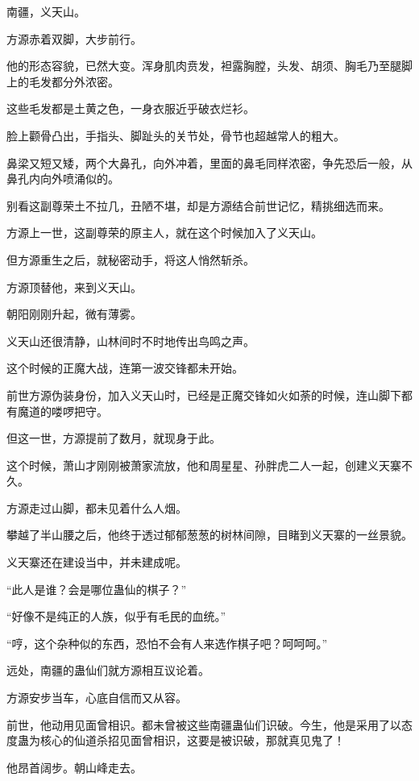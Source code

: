 
\begin{this_body}

南疆，义天山。

方源赤着双脚，大步前行。

他的形态容貌，已然大变。浑身肌肉贲发，袒露胸膛，头发、胡须、胸毛乃至腿脚上的毛发都分外浓密。

这些毛发都是土黄之色，一身衣服近乎破衣烂衫。

脸上颧骨凸出，手指头、脚趾头的关节处，骨节也超越常人的粗大。

鼻梁又短又矮，两个大鼻孔，向外冲着，里面的鼻毛同样浓密，争先恐后一般，从鼻孔内向外喷涌似的。

别看这副尊荣土不拉几，丑陋不堪，却是方源结合前世记忆，精挑细选而来。

方源上一世，这副尊荣的原主人，就在这个时候加入了义天山。

但方源重生之后，就秘密动手，将这人悄然斩杀。

方源顶替他，来到义天山。

朝阳刚刚升起，微有薄雾。

义天山还很清静，山林间时不时地传出鸟鸣之声。

这个时候的正魔大战，连第一波交锋都未开始。

前世方源伪装身份，加入义天山时，已经是正魔交锋如火如荼的时候，连山脚下都有魔道的喽啰把守。

但这一世，方源提前了数月，就现身于此。

这个时候，萧山才刚刚被萧家流放，他和周星星、孙胖虎二人一起，创建义天寨不久。

方源走过山脚，都未见着什么人烟。

攀越了半山腰之后，他终于透过郁郁葱葱的树林间隙，目睹到义天寨的一丝景貌。

义天寨还在建设当中，并未建成呢。

“此人是谁？会是哪位蛊仙的棋子？”

“好像不是纯正的人族，似乎有毛民的血统。”

“哼，这个杂种似的东西，恐怕不会有人来选作棋子吧？呵呵呵。”

远处，南疆的蛊仙们就方源相互议论着。

方源安步当车，心底自信而又从容。

前世，他动用见面曾相识。都未曾被这些南疆蛊仙们识破。今生，他是采用了以态度蛊为核心的仙道杀招见面曾相识，这要是被识破，那就真见鬼了！

他昂首阔步。朝山峰走去。


\end{this_body}

